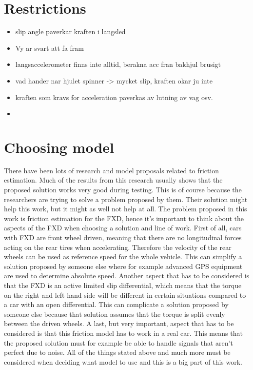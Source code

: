\section{Restrictions}

\begin{itemize}
	\item slip angle paverkar kraften i langsled
	\item Vy ar svart att fa fram
	\item langsaccelerometer finns inte alltid, berakna acc fran bakhjul brusigt
	\item vad hander nar hjulet spinner -> mycket slip, kraften okar ju inte
	\item kraften som kravs for acceleration paverkas av lutning av vag osv.
	\item 
\end{itemize}

\section{Choosing model}
There have been lots of research and model proposals related to friction estimation. Much of the results from this research usually shows that the proposed solution works very good during testing. This is of course because the researchers are trying to solve a problem proposed by them. Their solution might help this work, but it might as well not help at all. The problem proposed in this work is friction estimation for the FXD, hence it's important to think about the aspects of the FXD when choosing a solution and line of work. First of all, cars with FXD are front wheel driven, meaning that there are no longitudinal forces acting on the rear tires when accelerating. Therefore the velocity of the rear wheels can be used as reference speed for the whole vehicle. This can simplify a solution proposed by someone else where for example advanced GPS equipment are used to determine absolute speed. Another aspect that has to be considered is that the FXD is an active limited slip differential, which means that the torque on the right and left hand side will be different in certain situations compared to a car with an open differential. This can complicate a solution proposed by someone else because that solution assumes that the torque is split evenly between the driven wheels. A last, but very important, aspect that has to be considered is that this friction model has to work in a real car. This means that the proposed solution must for example be able to handle signals that aren't perfect due to noise. All of the things stated above and much more must be considered when deciding what model to use and this is a big part of this work.

